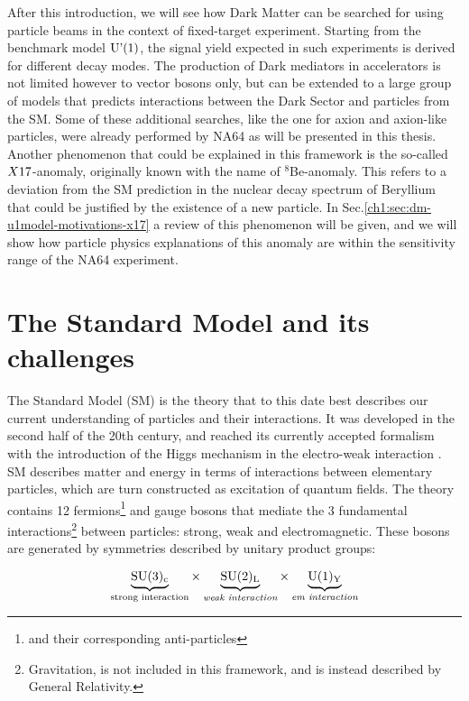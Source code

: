 After this introduction, we will see how Dark Matter can be searched for using particle beams in the context of fixed-target experiment. Starting from the benchmark model $\textrm{U'(1)}$, the signal yield expected in such experiments is derived for different decay modes. The production of Dark mediators in accelerators is not limited however to vector bosons only, but can be extended to a large group of models that predicts interactions between the Dark Sector and particles from the SM. Some of these additional searches, like the one for axion and axion-like particles, were already performed by NA64 as will be presented in this thesis.
Another phenomenon that could be explained in this framework is the so-called $X17$-anomaly, originally known with the name of $^8$Be-anomaly. This refers to a deviation from the SM prediction in the nuclear decay spectrum of Beryllium that could be justified by the existence of a new particle. In Sec.\ref{ch1:sec:dm-u1model-motivations-x17} a review of this phenomenon will be given, and we will show how particle physics explanations of this anomaly are within the sensitivity range of the NA64 experiment.


\section{The Standard Model and its challenges}
\label{ch1:sec:sm-puzzles}

The Standard Model (SM) is the theory that to this date best describes our current understanding of particles and their interactions. It was developed in the second half of the 20th century, and reached its currently accepted formalism with the introduction of the Higgs mechanism \cite{PhysRevLett.13.508} in the electro-weak interaction \cite{PhysRevLett.19.1264}. SM describes matter and energy in terms of interactions between elementary particles, which are turn constructed as excitation of quantum fields. The theory contains 12 fermions\footnote{and their corresponding anti-particles} and gauge bosons that mediate the 3 fundamental interactions\footnote{Gravitation, is not included in this framework, and is instead described by General Relativity.} between particles: strong, weak and electromagnetic. These bosons are generated by symmetries described by unitary product groups:

\begin{equation}
    \label{eq:sm-group}
    \underbrace{\rm{SU(3)_c}}_{\textrm{strong interaction}} \times \underbrace{\rm{SU(2)_L}}_{\textit{weak interaction}} \times \underbrace{\rm{U(1)_Y}}_{\textit{em interaction}}
\end{equation}

